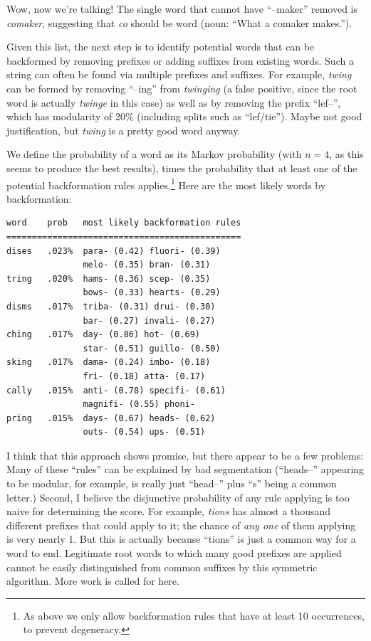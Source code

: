 \documentclass[twocolumn]{article}
\begin{document}
Wow, now we're talking! The single word that cannot have ``--maker''
removed is {\it comaker}, suggesting that {\it co} should be word
(noun: ``What a comaker makes.'').

Given this list, the next step is to identify potential words that
can be backformed by removing prefixes or adding suffixes from existing
words. Such a string can often be found via multiple prefixes and
suffixes. For example, {\it twing} can be formed by removing ``--ing''
from {\it twinging} (a false positive, since the root word is actually
{\it twinge} in this case) as well as by removing the prefix ``lef--'',
which has modularity of 20\% (including splits such as ``lef/tie'').
Maybe not good justification, but {\it twing} is a pretty good word
anyway.

We define the probability of a word as its Markov probability (with
$n=4$, as this seems to produce the best results), times the
probability that at least one of the potential backformation rules
applies.\!\footnote{As above we only allow backformation rules that
  have at least 10 occurrences, to prevent degeneracy.} Here are the
most likely words by backformation:

\begin{verbatim}
word    prob   most likely backformation rules
==============================================
dises   .023%  para- (0.42) fluori- (0.39) 
               melo- (0.35) bran- (0.31)  
tring   .020%  hams- (0.36) scep- (0.35) 
               bows- (0.33) hearts- (0.29)  
disms   .017%  triba- (0.31) drui- (0.30) 
               bar- (0.27) invali- (0.27)  
ching   .017%  day- (0.86) hot- (0.69) 
               star- (0.51) guillo- (0.50)    
sking   .017%  dama- (0.24) imbo- (0.18) 
               fri- (0.18) atta- (0.17)     
cally   .015%  anti- (0.78) specifi- (0.61)
               magnifi- (0.55) phoni-    
pring   .015%  days- (0.67) heads- (0.62)
               outs- (0.54) ups- (0.51)    
\end{verbatim}

I think that this approach shows promise, but there appear to be a few
problems: Many of these ``rules'' can be explained by bad segmentation
(``heads--'' appearing to be modular, for example, is really just
``head--'' plus ``s'' being a common letter.) Second, I believe the
disjunctive probability of any rule applying is too naive for
determining the score. For example, {\it tions} has almost a thousand
different prefixes that could apply to it; the chance of {\it any one}
of them applying is very nearly 1. But this is actually because ``tions''
is just a common way for a word to end. Legitimate root words to which
many good prefixes are applied cannot be easily distinguished from
common suffixes by this symmetric algorithm. More work is called for
here.
\end{document}
